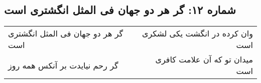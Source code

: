 \begin{center}
\section*{شماره ۱۲: گر هر دو جهان فی المثل انگشتری است}
\label{sec:012}
\begin{longtable}{l p{0.5cm} r}
گر هر دو جهان فی المثل انگشتری است
&&
وان کرده در انگشت یکی لشکری است
\\
گر رحم نیایدت بر آنکس همه روز
&&
میدان تو که آن علامت کافری است
\\
\end{longtable}
\end{center}

